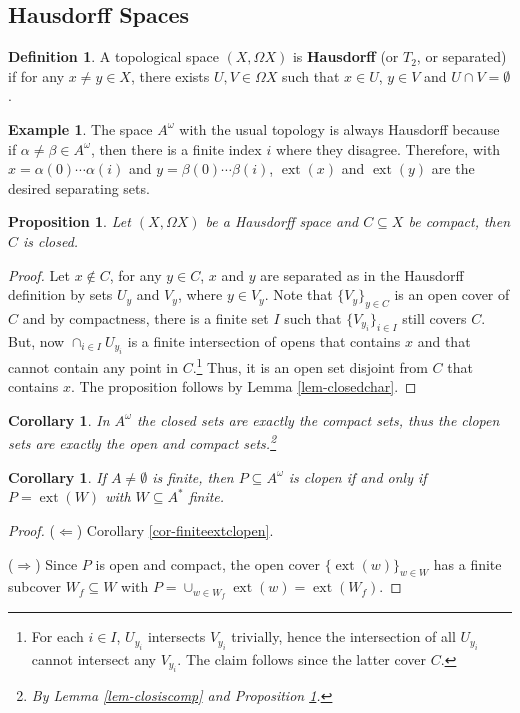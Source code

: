 \documentclass{tufte-handout} %
\newtheorem{cor}[thm]{Corollary}
\newtheorem{prop}[thm]{Proposition}
\theoremstyle{definition}
\newtheorem{defn}[thm]{Definition}
\newtheorem{exmp}[thm]{Example}
\theoremstyle{remark}
\newcommand{\0}{\textsf{0}}
\newcommand{\1}{\textsf{1}}
\DeclareMathOperator{\ext}{ext}
\begin{document}
\subsection{Hausdorff Spaces}
\begin{defn}
	A topological space $(X, \Omega X)$ is \textbf{Hausdorff} (or $T_2$, or separated) if for any $x \neq y \in X$, there exists $U, V \in \Omega X$ such that $x \in U$, $y \in V$ and $U \cap V = \emptyset$.
\end{defn}
\begin{exmp}
	The space $A^{\omega}$ with the usual topology is always Hausdorff because if $\alpha \neq \beta \in A^{\omega}$, then there is a finite index $i$ where they disagree. Therefore, with $x = \alpha(0)\cdots \alpha(i)$ and $y= \beta(0)\cdots \beta(i)$, $\ext(x)$ and $\ext(y)$ are the desired separating sets.
\end{exmp}
\begin{prop}\label{prop-compisclos}
	Let $(X, \Omega X)$ be a Hausdorff space and $C \subseteq X$ be compact, then $C$ is closed.
\end{prop}
\begin{proof}
	Let $x \notin C$, for any $y \in C$, $x$ and $y$ are separated as in the Hausdorff definition by sets $U_y$ and $V_y$, where $y \in V_y$. Note that $\{V_y\}_{y \in C}$ is an open cover of $C$ and by compactness, there is a finite set $I$ such that $\{V_{y_i}\}_{i \in I}$ still covers $C$. But, now $\cap_{i \in I} U_{y_i}$ is a finite intersection of opens that contains $x$ and that cannot contain any point in $C$.\footnote{For each $i \in I$, $U_{y_i}$ intersects $V_{y_i}$ trivially, hence the intersection of all $U_{y_i}$ cannot intersect any $V_{y_i}$. The claim follows since the latter cover $C$.}
	Thus, it is an open set disjoint from $C$ that contains $x$. The proposition follows by Lemma \ref{lem-closedchar}.
\end{proof}
\begin{cor}
	In $A^{\omega}$ the closed sets are exactly the compact sets, thus the clopen sets are exactly the open and compact sets.\footnote{By Lemma \ref{lem-closiscomp} and Proposition \ref{prop-compisclos}.}
\end{cor}
\begin{cor}\label{cor-clopenchar}
	If $A\neq \emptyset$ is finite, then $P \subseteq A^{\omega}$ is clopen if and only if $P = \ext(W)$ with $W \subseteq A^*$ finite.
\end{cor}
\begin{proof}
	($\Leftarrow$) Corollary \ref{cor-finiteextclopen}.
	
	($\Rightarrow$) Since $P$ is open and compact, the open cover $\{\ext(w)\}_{w \in W}$ has a finite subcover $W_f\subseteq W$ with $P = \cup_{w \in W_f} \ext(w) = \ext(W_f)$.
\end{proof}
\end{document}

